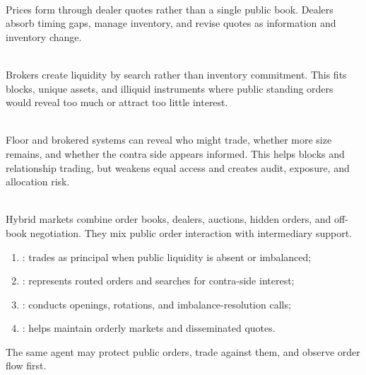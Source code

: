 \documentclass[a4paper,oneside,openany]{book}
\begin{document}
\begin{mechanism} \\
Prices form through dealer quotes rather than a single public book. Dealers absorb timing gaps, manage inventory, and revise quotes as information and inventory change.
\end{mechanism}

\begin{mechanism} \\
Brokers create liquidity by search rather than inventory commitment. This fits blocks, unique assets, and illiquid instruments where public standing orders would reveal too much or attract too little interest.
\end{mechanism}

\begin{caveat} \\
Floor and brokered systems can reveal who might trade, whether more size remains, and whether the contra side appears informed. This helps blocks and relationship trading, but weakens equal access and creates audit, exposure, and allocation risk.
\end{caveat}

\begin{taxonomy} \\
Hybrid markets combine order books, dealers, auctions, hidden orders, and off-book negotiation. They mix public order interaction with intermediary support.
\end{taxonomy}

\begin{taxonomy} 
\begin{enumerate}[label=\roman*.]
\setlength{\itemsep}{0pt}
\item {}: trades as principal when public liquidity is absent or imbalanced;
\item {}: represents routed orders and searches for contra-side interest;
\item {}: conducts openings, rotations, and imbalance-resolution calls;
\item {}: helps maintain orderly markets and disseminated quotes.
\end{enumerate}
The same agent may protect public orders, trade against them, and observe order flow first.
\end{taxonomy}
\end{document}
